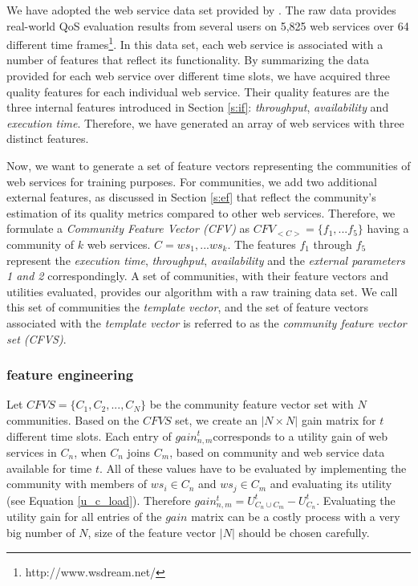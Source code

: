 \documentclass[10pt,journal,cspaper,compsoc]{IEEEtran}
\begin{document}
We have adopted the web service data set provided by \cite{10.1109/ISSRE.2011.17}. The raw data provides real-world QoS evaluation results from several users on 5,825 web services over 64 different time frames\footnote{http://www.wsdream.net/}. In this data set, each web service is associated with a number of features that reflect its functionality. By summarizing the data provided for each web service over different time slots, we have acquired three quality features for each individual web service. Their quality features are the three internal features introduced in Section \ref{s:if}: \emph{throughput}, \emph{availability} and \emph{execution time}. 
Therefore, we have generated an array of web services with three distinct features. 

Now, we want to generate a set of feature vectors representing the communities of web services for training purposes. For communities, we add two additional external features, as discussed in Section \ref{s:ef} that reflect the community's estimation of its quality metrics compared to other web services. Therefore, we formulate a \emph{Community Feature Vector (CFV)} as $CFV_{<C>} = \{f_1,...f_5\}$ having a community of $k$ web services. $C = {ws_1,...ws_k}$. The features $f_1$ through $f_5$ represent the \emph{execution time}, \emph{throughput}, \emph{availability} and the \emph{external parameters 1 and 2} correspondingly. A set of communities, with their feature vectors and utilities evaluated, provides our algorithm with a raw training data set. We call this set of communities the \emph{template vector}, and the set of feature vectors associated with the \emph{template vector} is referred to as the \emph{community feature vector set (CFVS)}.

\subsubsection{feature engineering}\label{sss:feng}
Let $CFVS = \{C_1, C_2,..., C_N\}$ be the community feature vector set with $N$ communities. Based on the $CFVS$ set, we create an $|N \times N|$ gain matrix for $t$ different time slots. Each entry of $gain_{n,m}^{t}$corresponds to a utility gain of web services in $C_n$, when $C_n$ joins $C_m$, based on community and web service data available for time $t$. All of these values have to be evaluated by implementing the community with members of $ws_i \in C_n$ and $ws_j \in C_m$ and evaluating its utility (see Equation \ref{u_c_load}). Therefore $gain_{n,m}^{t} = U_{C_n \cup C_m}^{t} - U_{C_{n}}^{t}$. Evaluating the utility gain for all entries of the $gain$ matrix can be a costly process with a very big number of $N$, size of the feature vector $|N|$ should be chosen carefully. 
\end{document}
